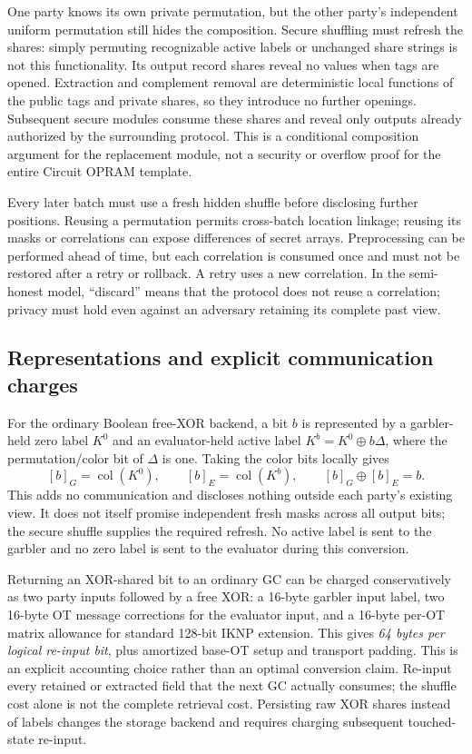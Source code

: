 One party knows its own private permutation, but the other party's
independent uniform permutation still hides the composition.  Secure
shuffling must refresh the shares: simply permuting recognizable active
labels or unchanged share strings is not this functionality.  Its output
record shares reveal no values when tags are opened.  Extraction and
complement removal are deterministic local functions of the public tags
and private shares, so they introduce no further openings.  Subsequent
secure modules consume these shares and reveal only outputs already
authorized by the surrounding protocol.  This is a conditional composition
argument for the replacement module, not a security or overflow proof for
the entire Circuit OPRAM template.

Every later batch must use a fresh hidden shuffle before disclosing further
positions.  Reusing a permutation permits cross-batch location linkage;
reusing its masks or correlations can expose differences of secret arrays.
Preprocessing can be performed ahead of time, but each correlation is
consumed once and must not be restored after a retry or rollback.  A retry
uses a new correlation.  In the semi-honest model, ``discard'' means that
the protocol does not reuse a correlation; privacy must hold even against
an adversary retaining its complete past view.

\subsection{Representations and explicit communication charges}

For the ordinary Boolean free-XOR backend, a bit $b$ is represented by a
garbler-held zero label $K^0$ and an evaluator-held active label
$K^b=K^0\oplus b\Delta$, where the permutation/color bit of $\Delta$ is
one.  Taking the color bits locally gives
\[
 [b]_G=\operatorname{col}(K^0),\qquad
 [b]_E=\operatorname{col}(K^b),\qquad
 [b]_G\oplus[b]_E=b.
\]
This adds no communication and discloses nothing outside each party's
existing view.  It does not itself promise independent fresh masks across
all output bits; the secure shuffle supplies the required refresh.  No
active label is sent to the garbler and no zero label is sent to the
evaluator during this conversion.

Returning an XOR-shared bit to an ordinary GC can be charged conservatively
as two party inputs followed by a free XOR: a 16-byte garbler input label,
two 16-byte OT message corrections for the evaluator input, and a 16-byte
per-OT matrix allowance for standard 128-bit IKNP extension.  This gives
\emph{64 bytes per logical re-input bit}, plus amortized base-OT setup and
transport padding.  This is an explicit accounting choice rather than an
optimal conversion claim.  Re-input every retained or extracted field that
the next GC actually consumes; the shuffle cost alone is not the complete
retrieval cost.  Persisting raw XOR shares instead of labels changes the
storage backend and requires charging subsequent touched-state re-input.

